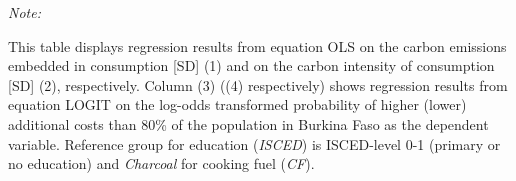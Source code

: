 \begin{table}[htbp!]
\begin{adjustbox}{width = 1\textwidth, max height = 0.95\textheight, center}
\begin{threeparttable}[b]
         \begin{tablenotes}\item \medskip \textit{Note:}
            \item This table displays regression results from equation OLS on the carbon emissions embedded in consumption [SD] (1) and on the carbon intensity of consumption [SD] (2), respectively. 
                                      Column (3) ((4) respectively) shows regression results from equation LOGIT on the log-odds transformed probability of higher (lower) additional costs than 80\% of the population in Burkina Faso as the dependent variable. Reference group for education (\textit{ISCED}) is ISCED-level 0-1 (primary or no education) and \textit{Charcoal} for cooking fuel (\textit{CF}).
         \end{tablenotes}
      \end{threeparttable}
   \end{adjustbox}
\end{table}


